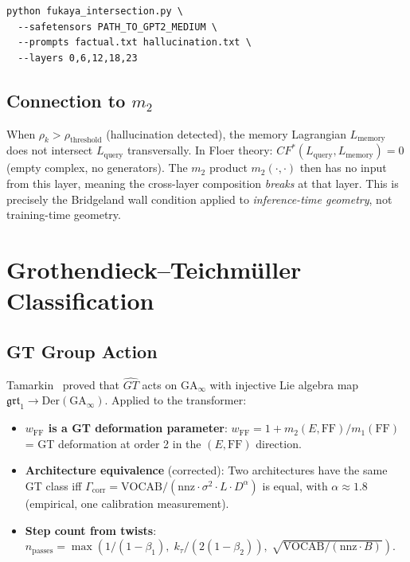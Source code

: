 \documentclass[11pt]{amsart}
\begin{document}
\begin{verbatim}
python fukaya_intersection.py \
  --safetensors PATH_TO_GPT2_MEDIUM \
  --prompts factual.txt hallucination.txt \
  --layers 0,6,12,18,23
\end{verbatim}

\subsection{Connection to $m_2$}

When $\rho_k > \rho_\mathrm{threshold}$ (hallucination detected),
the memory Lagrangian $L_\text{memory}$ does not intersect $L_\text{query}$
transversally.
In Floer theory: $CF^{*}(L_\text{query}, L_\text{memory}) = 0$
(empty complex, no generators).
The $m_2$ product $m_2(\cdot, \cdot)$ then has no input from this layer,
meaning the cross-layer composition \emph{breaks} at that layer.
This is precisely the Bridgeland wall condition applied to
\emph{inference-time geometry}, not training-time geometry.

\section{Grothendieck--Teichmüller Classification}
\label{sec:gt}

\subsection{GT Group Action}

Tamarkin~\cite{tamarkin0202039} proved that $\widehat{GT}$ acts on
$\mathrm{GA}_\infty$ with injective Lie algebra map
$\mathfrak{grt}_1 \to \mathrm{Der}(\mathrm{GA}_\infty)$.
Applied to the transformer:

\begin{itemize}
\item \textbf{$w_\mathrm{FF}$ is a GT deformation parameter}:
  $w_\mathrm{FF} = 1 + m_2(E,\mathrm{FF})/m_1(\mathrm{FF})$
  = GT deformation at order 2 in the $(E,\mathrm{FF})$ direction.
\item \textbf{Architecture equivalence} (corrected):
  Two architectures have the same GT class iff
  $\Gamma_\mathrm{corr} = \mathrm{VOCAB}/(\mathrm{nnz}\cdot\sigma^2\cdot L\cdot D^\alpha)$
  is equal, with $\alpha\approx 1.8$ (empirical, one calibration measurement).
\item \textbf{Step count from twists}:
  $n_\mathrm{passes} = \max(1/(1-\beta_1),\; k_\tau/(2(1-\beta_2)),\;
  \sqrt{\mathrm{VOCAB}/(\mathrm{nnz}\cdot B)})$.
\end{itemize}
\end{document}

